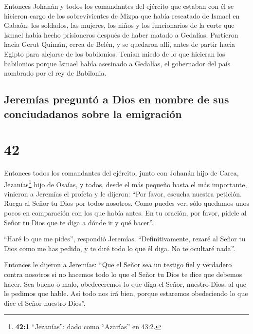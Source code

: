  Entonces Johanán y todos los comandantes del ejército
que estaban con él se hicieron cargo de los sobrevivientes de Mizpa que
había rescatado de Ismael en Gabaón: los soldados, las mujeres, los
niños y los funcionarios de la corte que Ismael había hecho prisioneros
después de haber matado a Gedalías.  Partieron hacia
Gerut Quimán, cerca de Belén, y se quedaron allí, antes de partir hacia
Egipto  para alejarse de los babilonios. Tenían miedo de
lo que hicieran los babilonios porque Ismael había asesinado a Gedalías,
el gobernador del país nombrado por el rey de Babilonia.

\hypertarget{jeremuxedas-preguntuxf3-a-dios-en-nombre-de-sus-conciudadanos-sobre-la-emigraciuxf3n}{%
\subsection{Jeremías preguntó a Dios en nombre de sus conciudadanos
sobre la
emigración}\label{jeremuxedas-preguntuxf3-a-dios-en-nombre-de-sus-conciudadanos-sobre-la-emigraciuxf3n}}

\hypertarget{section-41}{%
\section{42}\label{section-41}}

 Entonces todos los comandantes del ejército, junto con
Johanán hijo de Carea, Jezanías\footnote{\textbf{42:1} ``Jezanías'':
  dado como ``Azarías'' en 43:2.} hijo de Osaías, y todos, desde el más
pequeño hasta el más importante, vinieron a  Jeremías el
profeta y le dijeron: ``Por favor, escucha nuestra petición.
 Ruega al Señor tu Dios por todos nosotros. Como puedes
ver, sólo quedamos unos pocos en comparación con los que había antes. En
tu oración, por favor, pídele al Señor tu Dios que te diga a dónde ir y
qué hacer''.

 ``Haré lo que me pides'', respondió Jeremías.
``Definitivamente, rezaré al Señor tu Dios como me has pedido, y te diré
todo lo que él diga. No te ocultaré nada''.

 Entonces le dijeron a Jeremías: ``Que el Señor sea un
testigo fiel y verdadero contra nosotros si no hacemos todo lo que el
Señor tu Dios te dice que debemos hacer.  Sea bueno o
malo, obedeceremos lo que diga el Señor, nuestro Dios, al que le pedimos
que hable. Así todo nos irá bien, porque estaremos obedeciendo lo que
dice el Señor nuestro Dios''.

